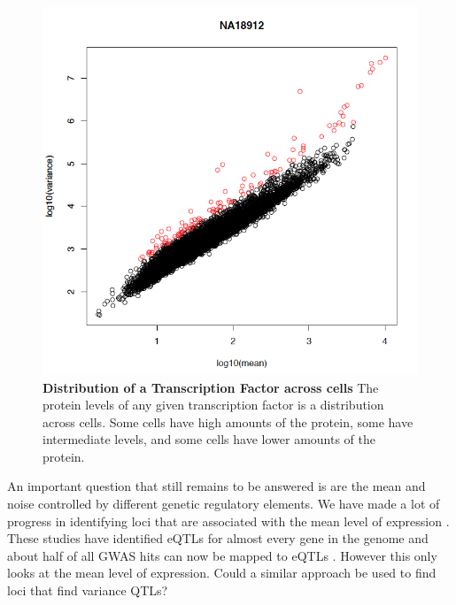 \begin{figure}[t!]  
    \centering
    \includegraphics[width=\linewidth, scale=0.25]{figures/intro/intro_outlier1.png}
    \caption[Distribution of a Transcription Factor across cells.]{%
        \textbf{Distribution of a Transcription Factor across cells}
        The protein levels of any given transcription factor is a distribution across cells. Some cells have high amounts of the protein, some have intermediate levels, and some cells have lower amounts of the protein.
    }
    \label{fig:intro1}
\end{figure}

An important question that still remains to be answered is are the mean and noise controlled by different genetic regulatory elements.
We have made a lot of progress in identifying loci that are associated with the mean level of expression \cite{gtex_consortium_genetic_2017} \cite{vosa2021ng} \cite{more}. These studies have identified eQTLs for almost every gene in the genome and about half of all GWAS hits can now be mapped to eQTLs \cite{gtex_consortium_genetic_2017}. However this only looks at the mean level of expression. Could a similar approach be used to find loci that find variance QTLs?

